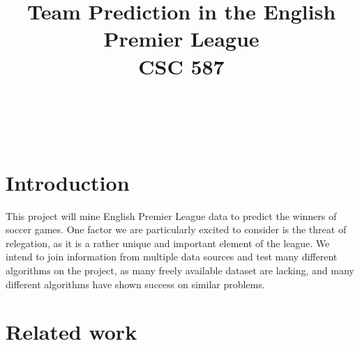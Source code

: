 \documentclass[conference]{IEEEtran}
\begin{document}
%

\title{Team Prediction in the English Premier League\\ {\large CSC 587}}


\author{
\\   %
\and
{}
\\
\and
{}

}

\maketitle
\IEEEpeerreviewmaketitle



\section{Introduction}
This project will mine English Premier League data to predict the winners of soccer games. One factor we are particularly excited to consider is the threat of relegation, as it is a rather unique and important element of the league. We intend to join information from multiple data sources and test many different algorithms on the project, as many freely available dataset are lacking, and many different algorithms have shown success on similar problems.

\section{Related work}
\end{document}
